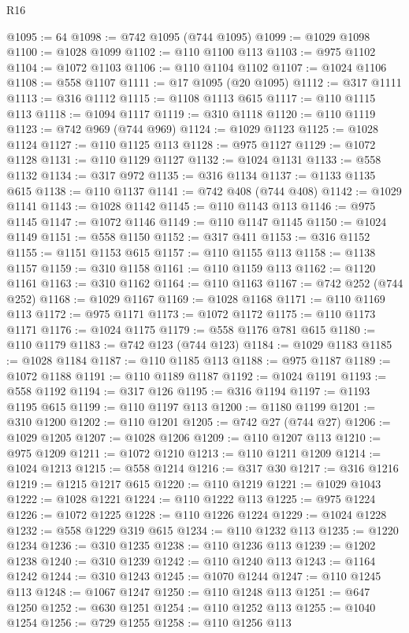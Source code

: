 \begin{lexlean}{R16}
\begin{coremodule}
@1095 := 64
@1098 := @742 @1095 (@744 @1095)
@1099 := @1029 @1098
@1100 := @1028 @1099
@1102 := @110 @1100 @113
@1103 := @975 @1102
@1104 := @1072 @1103
@1106 := @110 @1104 @1102
@1107 := @1024 @1106
@1108 := @558 @1107
@1111 := @17 @1095 (@20 @1095)
@1112 := @317 @1111
@1113 := @316 @1112
@1115 := @1108 @1113 @615
@1117 := @110 @1115 @113
@1118 := @1094 @1117
@1119 := @310 @1118
@1120 := @110 @1119
@1123 := @742 @969 (@744 @969)
@1124 := @1029 @1123
@1125 := @1028 @1124
@1127 := @110 @1125 @113
@1128 := @975 @1127
@1129 := @1072 @1128
@1131 := @110 @1129 @1127
@1132 := @1024 @1131
@1133 := @558 @1132
@1134 := @317 @972
@1135 := @316 @1134
@1137 := @1133 @1135 @615
@1138 := @110 @1137
@1141 := @742 @408 (@744 @408)
@1142 := @1029 @1141
@1143 := @1028 @1142
@1145 := @110 @1143 @113
@1146 := @975 @1145
@1147 := @1072 @1146
@1149 := @110 @1147 @1145
@1150 := @1024 @1149
@1151 := @558 @1150
@1152 := @317 @411
@1153 := @316 @1152
@1155 := @1151 @1153 @615
@1157 := @110 @1155 @113
@1158 := @1138 @1157
@1159 := @310 @1158
@1161 := @110 @1159 @113
@1162 := @1120 @1161
@1163 := @310 @1162
@1164 := @110 @1163
@1167 := @742 @252 (@744 @252)
@1168 := @1029 @1167
@1169 := @1028 @1168
@1171 := @110 @1169 @113
@1172 := @975 @1171
@1173 := @1072 @1172
@1175 := @110 @1173 @1171
@1176 := @1024 @1175
@1179 := @558 @1176 @781 @615
@1180 := @110 @1179
@1183 := @742 @123 (@744 @123)
@1184 := @1029 @1183
@1185 := @1028 @1184
@1187 := @110 @1185 @113
@1188 := @975 @1187
@1189 := @1072 @1188
@1191 := @110 @1189 @1187
@1192 := @1024 @1191
@1193 := @558 @1192
@1194 := @317 @126
@1195 := @316 @1194
@1197 := @1193 @1195 @615
@1199 := @110 @1197 @113
@1200 := @1180 @1199
@1201 := @310 @1200
@1202 := @110 @1201
@1205 := @742 @27 (@744 @27)
@1206 := @1029 @1205
@1207 := @1028 @1206
@1209 := @110 @1207 @113
@1210 := @975 @1209
@1211 := @1072 @1210
@1213 := @110 @1211 @1209
@1214 := @1024 @1213
@1215 := @558 @1214
@1216 := @317 @30
@1217 := @316 @1216
@1219 := @1215 @1217 @615
@1220 := @110 @1219
@1221 := @1029 @1043
@1222 := @1028 @1221
@1224 := @110 @1222 @113
@1225 := @975 @1224
@1226 := @1072 @1225
@1228 := @110 @1226 @1224
@1229 := @1024 @1228
@1232 := @558 @1229 @319 @615
@1234 := @110 @1232 @113
@1235 := @1220 @1234
@1236 := @310 @1235
@1238 := @110 @1236 @113
@1239 := @1202 @1238
@1240 := @310 @1239
@1242 := @110 @1240 @113
@1243 := @1164 @1242
@1244 := @310 @1243
@1245 := @1070 @1244
@1247 := @110 @1245 @113
@1248 := @1067 @1247
@1250 := @110 @1248 @113
@1251 := @647 @1250
@1252 := @630 @1251
@1254 := @110 @1252 @113
@1255 := @1040 @1254
@1256 := @729 @1255
@1258 := @110 @1256 @113

\end{coremodule}
\end{lexlean}
